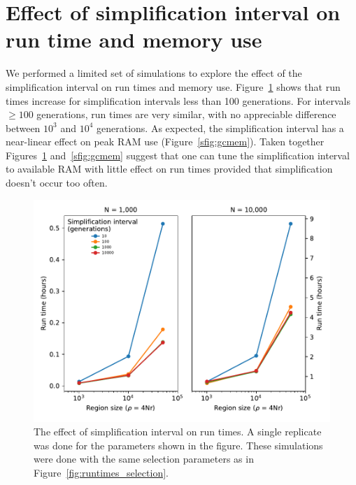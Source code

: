 \documentclass{article}
\begin{document}
\newpage

\section{Effect of simplification interval on run time and memory use}
\label{ss:gcinterval}
\renewcommand{\thefigure}{C\arabic{figure}}

We performed a limited set of simulations  to explore the effect of the simplification interval on run times and memory
use. Figure~\ref{sfig:gctime} shows that run times increase for simplification intervals less than 100 generations.  For
intervals $\geq 100$ generations, run times are very similar, with no appreciable difference between $10^3$ and $10^4$
generations.  As expected, the simplification interval has a near-linear effect on peak RAM use
(Figure~\ref{sfig:gcmem}).  Taken together Figures~\ref{sfig:gctime} and~\ref{sfig:gcmem} suggest that one can tune the
simplification interval to available RAM with little effect on run times provided that simplification doesn't occur too
often.

\begin{figure}[!h]
    \includegraphics{sims/gc_interval/GCtime}
    \caption{\label{sfig:gctime}The effect of simplification interval on run times.  A single replicate was done for the
        parameters shown in the figure.  These simulations were done with the same selection parameters as in
    Figure~\ref{fig:runtimes_selection}.}
\end{figure}
\end{document}
